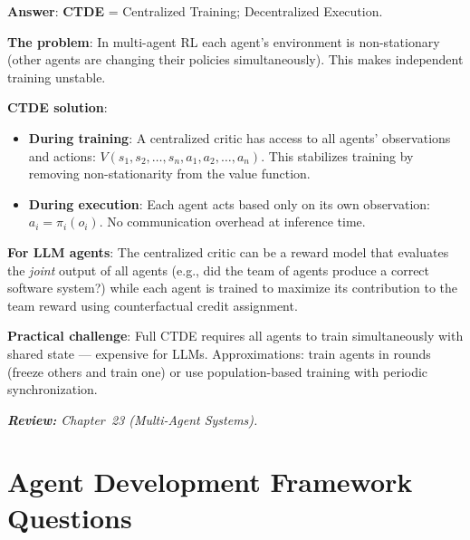 \begin{questionbox}
\textbf{Answer}: \textbf{CTDE} = Centralized Training; Decentralized Execution.

\textbf{The problem}: In multi-agent RL each agent’s environment is non-stationary (other agents are changing their policies simultaneously). This makes independent training unstable.

\textbf{CTDE solution}:

\begin{itemize}
  \item \textbf{During training}: A centralized critic has access to all agents’ observations and actions: $V(s_1, s_2, \ldots, s_n, a_1, a_2, \ldots, a_n)$. This stabilizes training by removing non-stationarity from the value function.
  \item \textbf{During execution}: Each agent acts based only on its own observation: $a_i = \pi_i(o_i)$. No communication overhead at inference time.
\end{itemize}

\textbf{For LLM agents}: The centralized critic can be a reward model that evaluates the \emph{joint} output of all agents (e.g., did the team of agents produce a correct software system?) while each agent is trained to maximize its contribution to the team reward using counterfactual credit assignment.

\textbf{Practical challenge}: Full CTDE requires all agents to train simultaneously with shared state --- expensive for LLMs. Approximations: train agents in rounds (freeze others and train one) or use population-based training with periodic synchronization.

\emph{\textbf{Review:} Chapter~23 (Multi-Agent Systems).}
\end{questionbox}

\section{Agent Development Framework Questions}
\label{agent-development-framework-questions}

